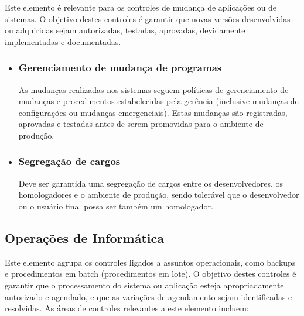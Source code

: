 	Este elemento é relevante para os controles de mudança de aplicações ou de sistemas. O objetivo destes controles é garantir que novas versões desenvolvidas ou adquiridas sejam autorizadas, testadas, aprovadas, devidamente implementadas e documentadas.
\begin{itemize}
\item	\subsubsection{Gerenciamento de mudança de programas}
	As mudanças realizadas nos sistemas seguem políticas de gerenciamento de mudanças e procedimentos estabelecidas pela gerência (inclusive mudanças de configurações ou mudanças emergenciais). Estas mudanças são registradas, aprovadas e testadas antes de serem promovidas para o ambiente de produção.
	
\item	\subsubsection{Segregação de cargos}
	Deve ser garantida uma segregação de cargos entre os desenvolvedores, os homologadores e o ambiente de produção, sendo tolerável que o desenvolvedor ou o usuário final possa ser também um homologador.
\end{itemize}
\subsection{Operações de Informática}

	Este elemento agrupa os controles ligados a assuntos operacionais, como backups e procedimentos em batch (procedimentos em lote).  O objetivo destes controles é garantir que o processamento do sistema ou aplicação esteja apropriadamente autorizado e agendado, e que as variações de agendamento sejam identificadas e resolvidas. As áreas de controles relevantes a este elemento incluem:
    
